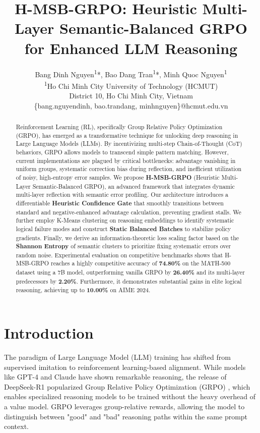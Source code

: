 \documentclass[letterpaper]{article}
\title{H-MSB-GRPO: Heuristic Multi-Layer Semantic-Balanced GRPO \\ for Enhanced LLM Reasoning}
\author{Bang Dinh Nguyen\textsuperscript{1}*, Bao Dang Tran\textsuperscript{1}*, Minh Quoc Nguyen\textsuperscript{1}\dag\\
\textsuperscript{1}Ho Chi Minh City University of Technology (HCMUT)\\
District 10, Ho Chi Minh City, Vietnam\\
\{bang.nguyendinh, bao.trandang, minhnguyen\}@hcmut.edu.vn
}
\begin{document}
\maketitle

\def\thefootnote{*}
\def\thefootnote{\dag}
\def\thefootnote{\arabic{footnote}}

\begin{abstract}
Reinforcement Learning (RL), specifically Group Relative Policy Optimization (GRPO), has emerged as a transformative technique for unlocking deep reasoning in Large Language Models (LLMs). By incentivizing multi-step Chain-of-Thought (CoT) behaviors, GRPO allows models to transcend simple pattern matching. However, current implementations are plagued by critical bottlenecks: advantage vanishing in uniform groups, systematic correction bias during reflection, and inefficient utilization of noisy, high-entropy error samples. We propose \textbf{H-MSB-GRPO} (Heuristic Multi-Layer Semantic-Balanced GRPO), an advanced framework that integrates dynamic multi-layer reflection with semantic error profiling. Our architecture introduces a differentiable \textbf{Heuristic Confidence Gate} that smoothly transitions between standard and negative-enhanced advantage calculation, preventing gradient stalls. We further employ K-Means clustering on reasoning embeddings to identify systematic logical failure modes and construct \textbf{Static Balanced Batches} to stabilize policy gradients. Finally, we derive an information-theoretic loss scaling factor based on the \textbf{Shannon Entropy} of semantic clusters to prioritize fixing systematic errors over random noise. Experimental evaluation on competitive benchmarks shows that H-MSB-GRPO reaches a highly competitive accuracy of \textbf{74.80\%} on the MATH-500 dataset using a 7B model, outperforming vanilla GRPO by \textbf{26.40\%} and its multi-layer predecessors by \textbf{2.20\%}. Furthermore, it demonstrates substantial gains in elite logical reasoning, achieving up to \textbf{10.00\%} on AIME 2024.
\end{abstract}

\section{Introduction}

The paradigm of Large Language Model (LLM) training has shifted from supervised imitation to reinforcement learning-based alignment. While models like GPT-4 and Claude have shown remarkable reasoning, the release of DeepSeek-R1 popularized Group Relative Policy Optimization (GRPO) \cite{deepseekmath}, which enables specialized reasoning models to be trained without the heavy overhead of a value model. GRPO leverages group-relative rewards, allowing the model to distinguish between "good" and "bad" reasoning paths within the same prompt context.
\end{document}
